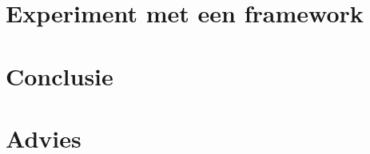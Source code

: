 \section{Experiment met een framework}\label{sec:experiment-met-een-framework}

\section{Conclusie}\label{sec:111}


\section{Advies}\label{sec222}




